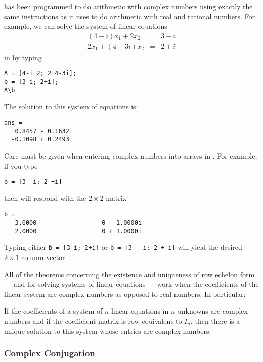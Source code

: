 \Matlab has been programmed to do arithmetic with complex numbers
using exactly the same instructions as it uses to do arithmetic
with real and rational numbers.  For example, we can solve the
system of linear equations
\begin{eqnarray*}
(4-i)x_1+2x_2 & = & 3-i \\
2x_1 +(4-3i)x_2 & = & 2+i
\end{eqnarray*}
in \Matlab by typing
\begin{verbatim}
A = [4-i 2; 2 4-3i];
b = [3-i; 2+i];
A\b
\end{verbatim} \index{\computer!$\backslash$}
The solution to this system of equations is:
\begin{verbatim}
ans =
   0.8457 - 0.1632i
  -0.1098 + 0.2493i
\end{verbatim}  

\footnotesize
{} Care must be given when entering complex
numbers into arrays in \Matlabp.  For example, if you type
\begin{verbatim}
b = [3 -i; 2 +i]
\end{verbatim}
then \Matlab will respond with the $2\times 2$ matrix
\begin{verbatim}
b =
   3.0000                  0 - 1.0000i
   2.0000                  0 + 1.0000i
\end{verbatim}
Typing either {\tt b = [3-i; 2+i]} or {\tt b = [3 - i; 2 + i]} will
yield the desired $2\times 1$ column vector.

\normalsize

All of the theorems concerning the existence and uniqueness
of row echelon form --- and for solving systems of linear
equations --- work when the coefficients of the linear system
are complex numbers as opposed to real numbers.  In particular:

\begin{thm}  \label{T:complexcoeff}
If the coefficients of a system of $n$ linear equations in $n$
unknowns are complex numbers and if the coefficient matrix is
row equivalent to $I_n$, then there is a unique solution to
this system whose entries are complex numbers.
\end{thm}  

\subsubsection*{Complex Conjugation}

